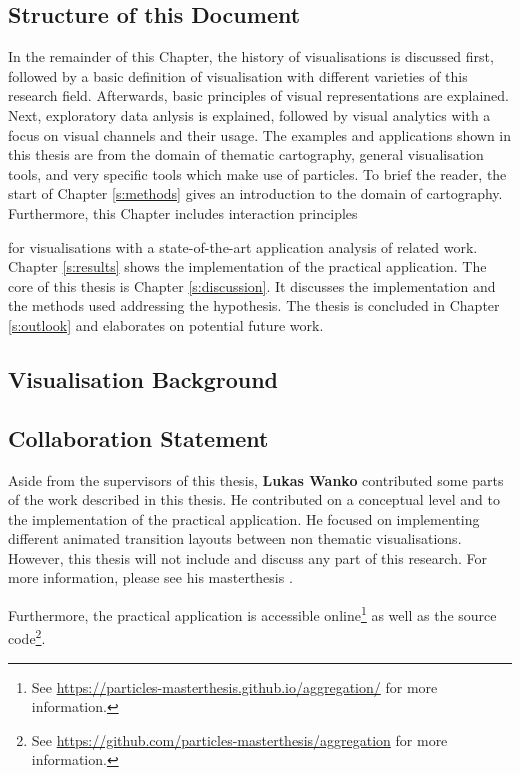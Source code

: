 \subsection{Structure of this Document}
In the remainder of this Chapter, the history of visualisations is discussed first, followed by a basic definition of visualisation with different varieties of this research field. Afterwards, basic principles of visual representations are explained. Next, exploratory data anlysis is explained, followed by visual analytics with a focus on visual channels and their usage.
The examples and applications shown in this thesis are from the domain of thematic cartography, general visualisation tools, and very specific tools which make use of particles. To brief the reader, the start of Chapter \ref{s:methods} gives an introduction to the domain of cartography. Furthermore, this Chapter includes interaction principles


for visualisations with a state-of-the-art application analysis of related work. Chapter \ref{s:results} shows the implementation of the practical application. The core of this thesis is Chapter \ref{s:discussion}. It discusses the implementation and the methods used addressing the hypothesis. The thesis is concluded in Chapter \ref{s:outlook} and elaborates on potential future work.

\subsection{Visualisation Background}


\subsection{Collaboration Statement}
\label{s:collaboration-statement}
Aside from the supervisors of this thesis, \textbf{Lukas Wanko} contributed some parts of the work described in this thesis. He contributed on a conceptual level and to the implementation of the practical application. He focused on implementing different animated transition layouts between non thematic visualisations. However, this thesis will not include and discuss any part of this research. For more information, please see his masterthesis .

Furthermore, the practical application is accessible online\footnote{See \href{https://particles-masterthesis.github.io/aggregation/}{https://particles-masterthesis.github.io/aggregation/} for more information.} as well as the source code\footnote{See \href{https://github.com/particles-masterthesis/aggregation}{https://github.com/particles-masterthesis/aggregation} for more information.}.